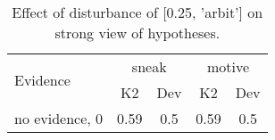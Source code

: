 \begin{table}\begin{tabular}{l|cc|cc}\toprule\multirow{2}{*}{Evidence} & \multicolumn{2}{c}{sneak}& \multicolumn{2}{c}{motive}\\& {K2} & {Dev}& {K2} & {Dev}\\\midrule
no evidence, 0 & \cellcolor{Bittersweet}0.59&\cellcolor{Bittersweet}0.5&\cellcolor{Bittersweet}0.59&\cellcolor{Bittersweet}0.5\\\bottomrule\end{tabular}\caption{Effect of disturbance of [0.25, 'arbit'] on strong view of hypotheses.}\end{table}